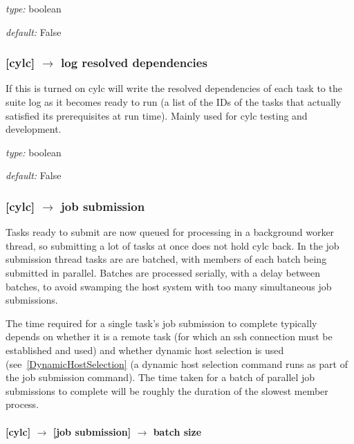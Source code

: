 \begin{myitemize}
    \item {\em type:} boolean
    \item {\em default:} False
\end{myitemize}

\subsubsection[log resolved dependencies]{[cylc] $\rightarrow$ log resolved dependencies}

If this is turned on cylc will write the resolved dependencies of each
task to the suite log as it becomes ready to run (a list of the IDs of
the tasks that actually satisfied its prerequisites at run time). Mainly
used for cylc testing and development.

\begin{myitemize}
    \item {\em type:} boolean
    \item {\em default:} False
\end{myitemize}

\subsubsection[job submission]{[cylc] $\rightarrow$ job submission}

Tasks ready to submit are now queued for processing in a background
worker thread, so submitting a lot of tasks at once does not hold cylc 
back.  In the job submission thread tasks are are batched, with members
of each batch being submitted in parallel. Batches are processed serially, 
with a delay between batches, to avoid swamping the host system with too
many simultaneous job submissions. 

The time required for a single task's job submission to complete
typically depends on whether it is a remote task (for which an ssh
connection must be established and used) and whether dynamic host
selection is used (see~\ref{DynamicHostSelection} (a dynamic host
selection command runs as part of the job submission command). The time
taken for a batch of parallel job submissions to complete will be
roughly the duration of the slowest member process. 

\paragraph[batch size]{[cylc] $\rightarrow$ [job submission] $\rightarrow$ batch size}

